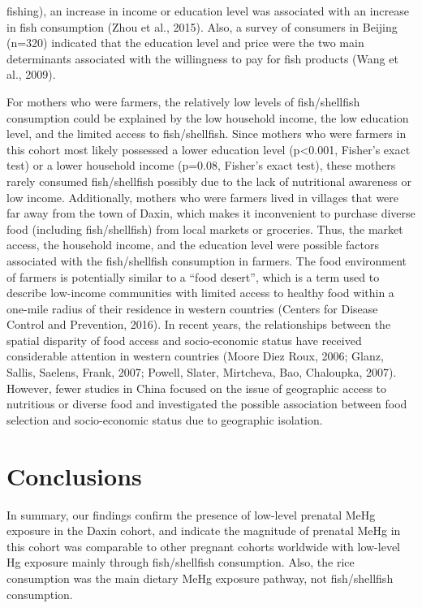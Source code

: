 fishing), an increase in income or education level was associated with an increase in fish consumption (Zhou et al., 2015). Also, a survey of consumers in Beijing (n=320) indicated that the education level and price were the two main determinants associated with the willingness to pay for fish products (Wang et al., 2009).

For mothers who were farmers, the relatively low levels of fish/shellfish consumption could be explained by the low household income, the low education level, and the limited access to fish/shellfish. Since mothers who were farmers in this cohort most likely possessed a lower education level (p<0.001, Fisher's exact test) or a lower household income (p=0.08, Fisher's exact test), these mothers rarely consumed fish/shellfish possibly due to the lack of nutritional awareness or low income. Additionally, mothers who were farmers lived in villages that were far away from the town of Daxin, which makes it inconvenient to purchase diverse food (including fish/shellfish) from local markets or groceries. Thus, the market access, the household income, and the education level were possible factors associated with the fish/shellfish consumption in farmers. The food environment of farmers is potentially similar to a ``food desert'', which is a term used to describe low-income communities with limited access to healthy food within a one-mile radius of their residence in western countries (Centers for Disease Control and Prevention, 2016). In recent years, the relationships between the spatial disparity of food access and socio-economic status have received considerable attention in western countries (Moore  Diez Roux, 2006; Glanz, Sallis, Saelens,  Frank, 2007; Powell, Slater, Mirtcheva, Bao,  Chaloupka, 2007). However, fewer studies in China focused on the issue of geographic access to nutritious or diverse food and investigated the possible association between food selection and socio-economic status due to geographic isolation.

\section{Conclusions}

In summary, our findings confirm the presence of low-level prenatal MeHg exposure in the Daxin cohort, and indicate the magnitude of prenatal MeHg in this cohort was comparable to other pregnant cohorts worldwide with low-level Hg exposure mainly through fish/shellfish consumption. Also, the rice consumption was the main dietary MeHg exposure pathway, not fish/shellfish consumption.

